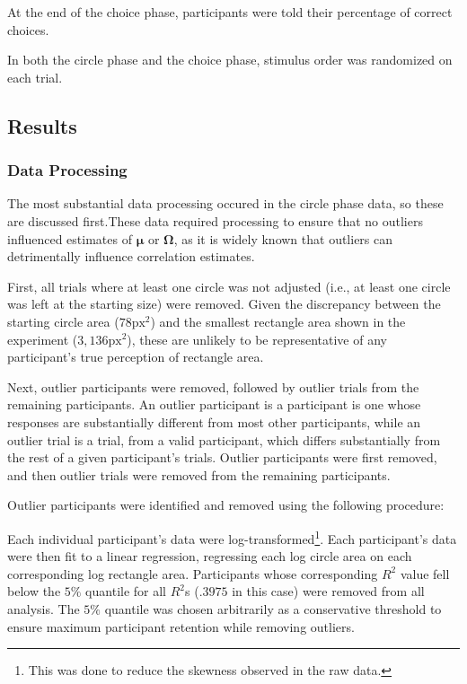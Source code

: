At the end of the choice phase, participants were told their percentage of correct choices. 

In both the circle phase and the choice phase, stimulus order was randomized on each trial.

\subsection{Results}
\subsubsection{Data Processing}

The most substantial data processing occured in the circle phase data, so these are discussed first.These data required processing to ensure that no outliers influenced estimates of $\boldsymbol{\mu}$ or $\mathbf{\Omega}$, as it is widely known that outliers can detrimentally influence correlation estimates. 

First, all trials where at least one circle was not adjusted (i.e.,
at least one circle was left at the starting size) were removed. Given the discrepancy between the starting circle area ($78\text{px}^2$) and the smallest rectangle area shown in the experiment ($3,136\text{px}^2$), these are unlikely to be representative of any participant's true perception of rectangle area.

Next, outlier participants were removed, followed by outlier trials from the remaining participants. An outlier participant is a participant is one whose responses are substantially different from most other participants, while an outlier trial is a trial, from a valid participant, which differs substantially from the rest of a given participant's trials. Outlier participants were first removed, and then outlier trials were removed from the remaining participants.

Outlier participants were identified and removed using the following procedure:

Each individual participant's data were log-transformed\footnote{This was done to reduce the skewness observed in the raw data.}. Each participant's data were then fit to a linear regression, regressing each log circle area on each corresponding log rectangle area. Participants whose corresponding $R^2$ value fell below the $5\%$ quantile for all $R^2$s ($.3975$ in this case) were removed from all analysis. The $5\%$ quantile was chosen arbitrarily as a conservative threshold to ensure maximum participant retention while removing outliers. 

